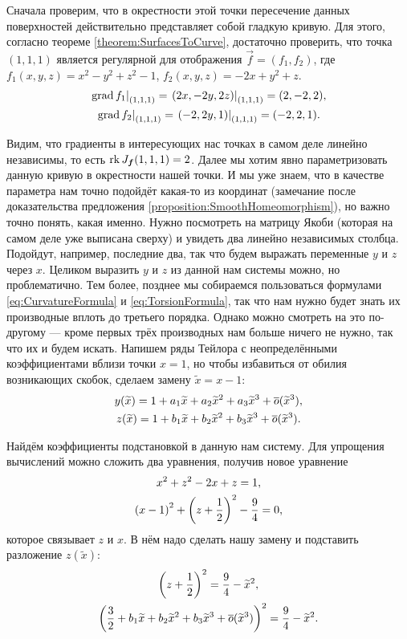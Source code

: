 \begin{solution}
	Сначала проверим, что в окрестности этой точки пересечение данных поверхностей действительно представляет собой гладкую кривую. Для этого, согласно теореме \ref{theorem:SurfacesToCurve}, достаточно проверить, что точка $(1, 1, 1)$ является регулярной для отображения $\vec{f} = (f_1, f_2)$, где $f_1(x, y, z) = x^2 - y^2 + z^2 - 1$, $f_2(x, y, z) = -2x + y^2 + z$.
	\begin{gather*}
		\left.\operatorname{grad} f_1\right|_{(1, 1, 1)} = \left.(2x, -2y, 2z)\right|_{(1, 1, 1)} = (2, -2, 2),\\
		\left.\operatorname{grad} f_2\right|_{(1, 1, 1)} = \left.(-2, 2y, 1)\right|_{(1, 1, 1)} = (-2, 2, 1).
	\end{gather*}

	Видим, что градиенты в интересующих нас точках в самом деле линейно независимы, то есть $\operatorname{rk} J_{\boldsymbol{f}}(1, 1, 1) = 2$. Далее мы хотим явно параметризовать данную кривую в окрестности нашей точки. И мы уже знаем, что в качестве параметра нам точно подойдёт какая-то из координат (замечание после доказательства предложения \ref{proposition:SmoothHomeomorphism}), но важно точно понять, какая именно. Нужно посмотреть на матрицу Якоби (которая на самом деле уже выписана сверху) и увидеть два линейно независимых столбца. Подойдут, например, последние два, так что будем выражать переменные $y$ и $z$ через $x$. Целиком выразить $y$ и $z$ из данной нам системы можно, но проблематично. Тем более, позднее мы собираемся пользоваться формулами \eqref{eq:CurvatureFormula} и \eqref{eq:TorsionFormula}, так что нам нужно будет знать их производные вплоть до третьего порядка. Однако можно смотреть на это по-другому --- кроме первых трёх производных нам больше ничего не нужно, так что их и будем искать. Напишем ряды Тейлора с неопределёнными коэффициентами вблизи точки $x = 1$, но чтобы избавиться от обилия возникающих скобок, сделаем замену $\widetilde{x} = x - 1$:
	\begin{gather*}
		y(\widetilde{x}) = 1 + a_1\widetilde{x} + a_2\widetilde{x}^2 + a_3\widetilde{x}^3 + \overline{o}(\widetilde{x}^3),\\
		z(\widetilde{x}) = 1 + b_1\widetilde{x} + b_2\widetilde{x}^2 + b_3\widetilde{x}^3 + \overline{o}(\widetilde{x}^3).
	\end{gather*}

	Найдём коэффициенты подстановкой в данную нам систему. Для упрощения вычислений можно сложить два уравнения, получив новое уравнение
	\begin{gather*}
		x^2 + z^2 - 2x + z = 1,\\
		\left(x - 1\right)^2 + \left(z + \frac{1}{2}\right)^2 - \frac{9}{4} = 0,
	\end{gather*}
	которое связывает $z$ и $x$. В нём надо сделать нашу замену и подставить разложение $z(\widetilde{x})$:
	\begin{gather*}
		\left(z + \frac{1}{2}\right)^2 = \frac{9}{4} - \widetilde{x}^2,\\
		\left(\frac{3}{2} + b_1\widetilde{x} + b_2\widetilde{x}^2 + b_3\widetilde{x}^3 + \overline{o}(\widetilde{x}^3)\right)^2 = \frac{9}{4} - \widetilde{x}^2.
	\end{gather*}
	

\end{solution}
